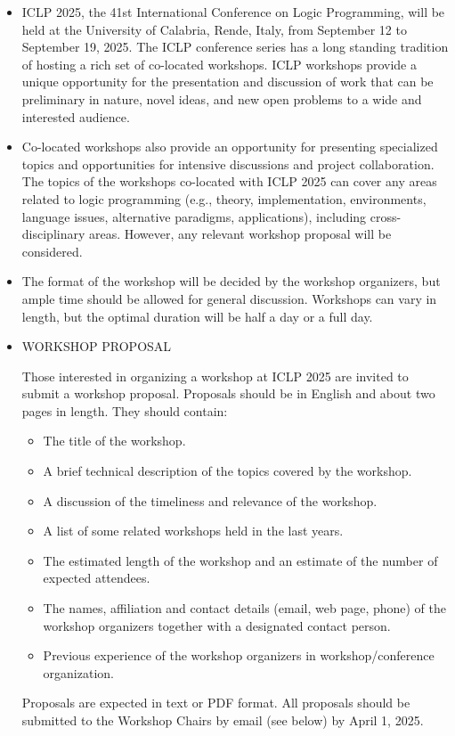 \documentclass[prodmode,acmtecs]{acmsmall} %
\begin{document}
\begin{itemize}\item  ICLP 2025, the 41st International Conference on Logic Programming, will be held at the University of Calabria, Rende, Italy, from September 12 to September 19, 2025. The ICLP conference series has a long standing tradition of hosting a rich set of co-located workshops. ICLP workshops provide a unique opportunity for the presentation and discussion of work that can be preliminary in nature, novel ideas, and new open problems to a wide and interested audience. 
 
\item  Co-located workshops also provide an opportunity for presenting specialized topics and opportunities for intensive discussions and project collaboration. The topics of the workshops co-located with ICLP 2025 can cover any areas related to logic programming (e.g., theory, implementation, environments, language issues, alternative paradigms, applications), including cross-disciplinary areas. However, any relevant workshop proposal will be considered.   
 
\item  The format of the workshop will be decided by the workshop organizers, but ample time should be allowed for general discussion. Workshops can vary in length, but the optimal duration will be half a day or a full day. 
 
\item  WORKSHOP PROPOSAL 
 
  Those interested in organizing a workshop at ICLP 2025 are invited to submit a workshop proposal. Proposals should be in English and about two pages in length. They should contain: 
 
\begin{itemize}\item  The title of the workshop.
\item  A brief technical description of the topics covered by the workshop.
\item  A discussion of the timeliness and relevance of the workshop.
\item  A list of some related workshops held in the last years.
\item  The estimated length of the workshop and an estimate of the number of expected attendees.
\item  The names, affiliation and contact details (email, web page, phone) of the workshop organizers together with a designated contact person.
\item  Previous experience of the workshop organizers in workshop/conference organization.
\end{itemize} 
  Proposals are expected in text or PDF format. All proposals should be submitted to the Workshop Chairs by email (see below) by April 1, 2025. 
 

\end{itemize}
\end{document}
